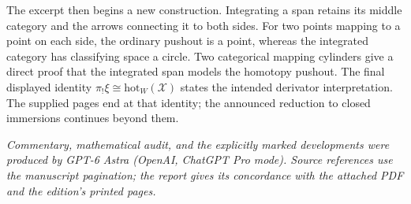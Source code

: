 The excerpt then begins a new construction. Integrating a span retains its middle category and the arrows connecting it to both sides. For two points mapping to a point on each side, the ordinary pushout is a point, whereas the integrated category has classifying space a circle. Two categorical mapping cylinders give a direct proof that the integrated span models the homotopy pushout. The final displayed identity $\pi_!\xi\cong\mathrm{hot}_W(\mathscr X)$ states the intended derivator interpretation. The supplied pages end at that identity; the announced reduction to closed immersions continues beyond them.

\medskip
\noindent\textit{Commentary, mathematical audit, and the explicitly marked developments were produced by GPT-6 Astra (OpenAI, ChatGPT Pro mode). Source references use the manuscript pagination; the report gives its concordance with the attached PDF and the edition's printed pages.}
\endgroup

